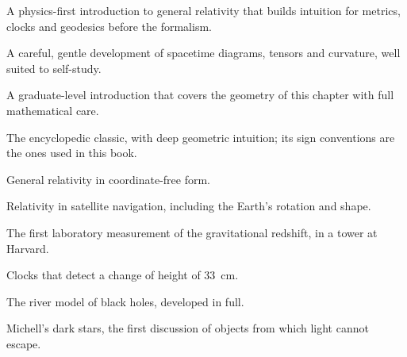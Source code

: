 \begin{furtherreading}
\item[\textcite{Hartle2003}] A physics-first introduction to general relativity
  that builds intuition for metrics, clocks and geodesics before the formalism.
\item[\textcite{Schutz2009}] A careful, gentle development of spacetime
  diagrams, tensors and curvature, well suited to self-study.
\item[\textcite{Carroll2004}] A graduate-level introduction that covers the
  geometry of this chapter with full mathematical care.
\item[\textcite{Misner1973}] The encyclopedic classic, with deep geometric
  intuition; its sign conventions are the ones used in this book.
\item[\textcite{Wald1984}] General relativity in coordinate-free form.
\item[\textcite{Ashby2003}] Relativity in satellite navigation, including the
  Earth's rotation and shape.
\item[\textcite{Pound1960}] The first laboratory measurement of the
  gravitational redshift, in a tower at Harvard.
\item[\textcite{Chou2010}] Clocks that detect a change of height of
  \SI{33}{\centi\metre}.
\item[\textcite{Hamilton2008}] The river model of black holes, developed in
  full.
\item[\textcite{Michell1784}] Michell's dark stars, the first discussion of
  objects from which light cannot escape.
\end{furtherreading}
